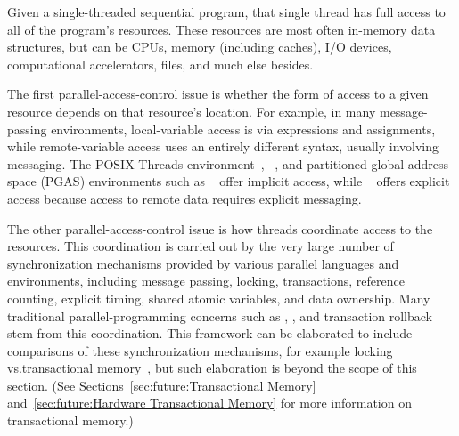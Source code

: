 Given a single-threaded sequential program, that single
thread has full access to all of the program's resources.
These resources are most often in-memory data structures, but can be CPUs,
memory (including caches), I/O devices, computational accelerators, files,
and much else besides.

The first parallel-access-control issue is whether the form of access to
a given resource depends on that resource's location.
For example, in many message-passing environments, local-variable
access is via expressions and assignments,
while remote-variable access uses an entirely different
syntax, usually involving messaging.
The POSIX Threads environment~\cite{OpenGroup1997pthreads},
~\cite{DIS9075SQL92}, and
partitioned global address-space (PGAS) environments
such as ~\cite{ElGhazawi2003UPC,UPCConsortium2013}
offer implicit access,
while ~\cite{MPIForum2008} offers
explicit access because access to remote data requires explicit
messaging.

The other parallel-access-control issue is how threads coordinate
access to the resources.
This coordination is carried out by
the very large number of synchronization mechanisms
provided by various parallel languages and environments,
including message passing, locking, transactions,
reference counting, explicit timing, shared atomic variables, and data
ownership.
Many traditional parallel-programming concerns such as ,
, and transaction rollback stem from this coordination.
This framework can be elaborated to include comparisons
of these synchronization mechanisms, for example locking vs.\@ transactional
memory~\cite{McKenney2007PLOSTM}, but such elaboration is beyond the
scope of this section.
(See
Sections~\ref{sec:future:Transactional Memory}
and~\ref{sec:future:Hardware Transactional Memory}
for more information on transactional memory.)

\QuickQuizEnd


